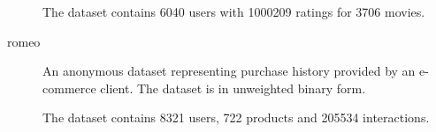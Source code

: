 \begin{description}
        The dataset contains 6040 users with 1000209 ratings for 3706 movies.



    \item[romeo] \hfill

        An anonymous dataset representing purchase history provided by an e-commerce client. The dataset is in unweighted binary form.

        The dataset contains 8321 users, 722 products and 205534 interactions.



\end{description}

